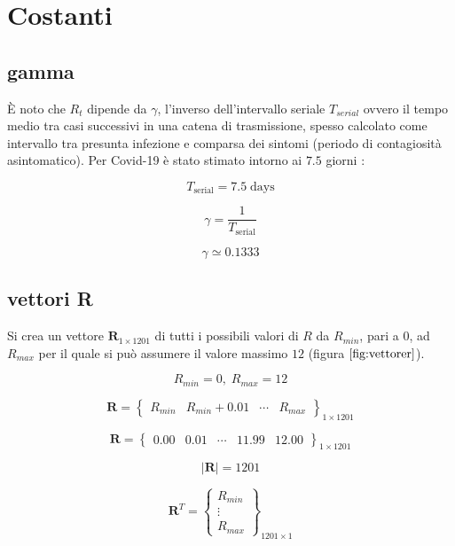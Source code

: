 \documentclass[11pt]{article}
\begin{document}
    \hypertarget{costanti}{%
\section{Costanti}\label{costanti}}

    \hypertarget{gamma}{%
\subsection{gamma}\label{gamma}}

    È noto che \(R_t\) dipende da \(\gamma\), l'inverso dell'intervallo
seriale \(T_{serial}\) ovvero il tempo medio tra casi successivi in una
catena di trasmissione, spesso calcolato come intervallo tra presunta
infezione e comparsa dei sintomi (periodo di contagiosità asintomatico).
Per Covid-19 è stato stimato intorno ai \(7.5\) giorni
\cite{sanche2020high}:

    \[ T_{\textrm{serial}} = 7.5 \; \textrm{days} \]

\begin{equation}\label{eq:gamma}
\gamma = \frac{1}{T_{\textrm{serial}}}
\end{equation}

    \[\gamma \simeq 0.1333\]

    
    \hypertarget{vettori-r}{%
\subsection{vettori R}\label{vettori-r}}

    Si crea un vettore \(\mathbf{R}_{1\times1201}\) di tutti i possibili
valori di \(R\) da \(R_{min}\), pari a \(0\), ad \(R_{max}\) per il
quale si può assumere il valore massimo \(12\) (figura
\(\ref{fig:vettorer}\)).

    \[ R_{min} = 0 ,\; R_{max} = 12 \]

\[ \mathbf{R} = \begin{Bmatrix}
R_{min} & R_{min}+0.01 & \cdots & R_{max}
\end{Bmatrix}_{1\times1201} \]

    \[\mathbf{R} = \begin{Bmatrix} 0.00 & 0.01 & \cdots & 11.99 & 12.00 \end{Bmatrix}_{1\times1201}\]

    
    \[| \mathbf{R} | = 1201\]

    
    \[ \mathbf{R}^{T} = \begin{Bmatrix}
R_{min}\\ 
\vdots\\ 
R_{max}
\end{Bmatrix}_{1201 \times 1} \]
\end{document}
